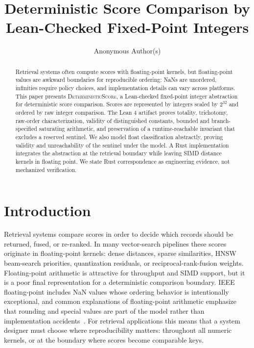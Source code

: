 \documentclass[a4paper,UKenglish,cleveref,autoref,thm-restate,anonymous]{lipics-v2021}
\title{Deterministic Score Comparison by Lean-Checked Fixed-Point Integers}
\author{Anonymous Author(s)}{Anonymous Institution}{anonymous@example.com}{}{}
\newcommand{\ds}{\textsc{DeterministicScore}\xspace}
\begin{document}
\maketitle

\begin{abstract}
Retrieval systems often compute scores with floating-point kernels, but floating-point values are awkward boundaries for reproducible ordering: NaNs are unordered, infinities require policy choices, and implementation details can vary across platforms.  This paper presents \ds, a Lean-checked fixed-point integer abstraction for deterministic score comparison.  Scores are represented by integers scaled by $2^{32}$ and ordered by raw integer comparison.  The Lean 4 artifact proves totality, trichotomy, raw-order characterization, validity of distinguished constants, bounded and branch-specified saturating arithmetic, and preservation of a runtime-reachable invariant that excludes a reserved sentinel.  We also model float classification abstractly, proving validity and unreachability of the sentinel under the model.  A Rust implementation integrates the abstraction at the retrieval boundary while leaving SIMD distance kernels in floating point.  We state Rust correspondence as engineering evidence, not mechanized verification.
\end{abstract}

\section{Introduction}
\label{sec:introduction}

Retrieval systems compare scores in order to decide which records should be returned, fused, or re-ranked.  In many vector-search pipelines these scores originate in floating-point kernels: dense distances, sparse similarities, HNSW beam-search priorities, quantization residuals, or reciprocal-rank-fusion weights.  Floating-point arithmetic is attractive for throughput and SIMD support, but it is a poor final representation for a deterministic comparison boundary.  IEEE floating-point includes NaN values whose ordering behavior is intentionally exceptional, and common explanations of floating-point arithmetic emphasize that rounding and special values are part of the model rather than implementation accidents~\cite{goldberg1991floating,ieee7542019}.  For retrieval applications this means that a system designer must choose where reproducibility matters: throughout all numeric kernels, or at the boundary where scores become comparable keys.
\end{document}
